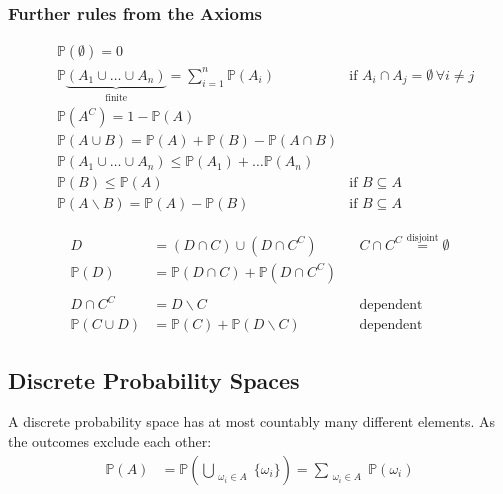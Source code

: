 \subsubsection{Further rules from the Axioms}\label{sssec:rules_from_axioms}
\noindent\begin{align*}
     & \mathbb{P}(\emptyset) = 0                                                                                                                                  \\
     & \mathbb{P}  \underbrace{(A_1 \cup \dots \cup A_n)}_{\text{finite}} = \sum_{i=1}^{n} \mathbb{P}(A_i) & \text{if } A_i\cap A_j = \emptyset\, \forall i\neq j \\
     & \mathbb{P}(A^C) = 1-\mathbb{P}(A)                                                                                                                          \\
     & \mathbb{P}(A\cup B) = \mathbb{P}(A)+\mathbb{P}(B) - \mathbb{P}(A\cap B)                                                                                    \\
     & \mathbb{P}(A_1 \cup \dots \cup A_n) \leq \mathbb{P}(A_1)+\dots \mathbb{P}(A_n)                                                                             \\
     & \mathbb{P}(B) \leq \mathbb{P}(A)                                                                    & \text{if } B\subseteq A                              \\
     & \mathbb{P}(A\backslash B) = \mathbb{P}(A)-\mathbb{P}(B)                                             & \text{if } B\subseteq A
\end{align*}

\noindent\begin{align*}
    D                   & =(D\cap C) \cup (D\cap C^C)                   &  & C\cap C^C \overset{\text{disjoint}}{=} \emptyset \\
    \mathbb{P}(D)       & = \mathbb{P}(D\cap C) + \mathbb{P}(D\cap C^C)                                                       \\\\
    D\cap C^C           & = D\backslash C                               &  & \text{dependent}                                 \\
    \mathbb{P}(C\cup D) & = \mathbb{P}(C) + \mathbb{P}(D\backslash C)   &  & \text{dependent}
\end{align*}

\subsection{Discrete Probability Spaces}
A discrete probability space has at most countably many different elements. As the outcomes exclude each other:
\noindent\begin{align*}
    \mathbb{P}(A) & = \mathbb{P}\left(\bigcup_{\substack{\omega_i \in A}}\{\omega_i\}\right)= \sum_{\substack{\omega_i \in A}} \mathbb{P}(\omega_i)
\end{align*}
